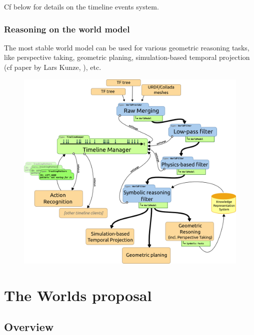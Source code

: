 \documentclass[a4paper]{article}
\begin{document}
Cf below for details on the timeline events system.

\FloatBarrier
\subsubsection{Reasoning on the world model}

The most stable world model can be used for various geometric reasoning tasks,
like perspective taking, geometric planing, simulation-based temporal
projection (cf paper by Lars Kunze, \cite{Kunze2011a}), etc.

\begin{figure}[!h]
    \centering
    \includegraphics[scale=0.5]{images/spark2_archi2_5.png}
\end{figure}


\FloatBarrier
\section{
  The Worlds proposal%
  \label{the-worlds-proposal}%
}



\subsection{
  Overview%
  \label{overview}%
}
\end{document}
